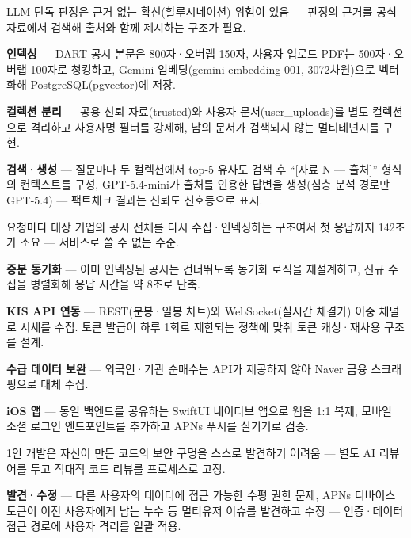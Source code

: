 \begin{substeps}
  \item LLM 단독 판정은 근거 없는 확신(할루시네이션) 위험이 있음 --- 판정의 근거를 공식 자료에서 검색해 출처와 함께 제시하는 구조가 필요.
  \item \textbf{인덱싱} --- DART 공시 본문은 800자·오버랩 150자, 사용자 업로드 PDF는 500자·오버랩 100자로 청킹하고, Gemini 임베딩(gemini-embedding-001, 3072차원)으로 벡터화해 PostgreSQL(pgvector)에 저장.
  \item \textbf{컬렉션 분리} --- 공용 신뢰 자료(trusted)와 사용자 문서(user\_uploads)를 별도 컬렉션으로 격리하고 사용자명 필터를 강제해, 남의 문서가 검색되지 않는 멀티테넌시를 구현.
  \item \textbf{검색·생성} --- 질문마다 두 컬렉션에서 top-5 유사도 검색 후 ``[자료 N --- 출처]'' 형식의 컨텍스트를 구성, GPT-5.4-mini가 출처를 인용한 답변을 생성(심층 분석 경로만 GPT-5.4) --- 팩트체크 결과는 신뢰도 신호등으로 표시.
\end{substeps}

\begin{substeps}
  \item 요청마다 대상 기업의 공시 전체를 다시 수집·인덱싱하는 구조여서 첫 응답까지 142초가 소요 --- 서비스로 쓸 수 없는 수준.
  \item \textbf{증분 동기화} --- 이미 인덱싱된 공시는 건너뛰도록 동기화 로직을 재설계하고, 신규 수집을 병렬화해 응답 시간을 약 8초로 단축.
\end{substeps}

\begin{substeps}
  \item \textbf{KIS API 연동} --- REST(분봉·일봉 차트)와 WebSocket(실시간 체결가) 이중 채널로 시세를 수집. 토큰 발급이 하루 1회로 제한되는 정책에 맞춰 토큰 캐싱·재사용 구조를 설계.
  \item \textbf{수급 데이터 보완} --- 외국인·기관 순매수는 API가 제공하지 않아 Naver 금융 스크래핑으로 대체 수집.
  \item \textbf{iOS 앱} --- 동일 백엔드를 공유하는 SwiftUI 네이티브 앱으로 웹을 1:1 복제, 모바일 소셜 로그인 엔드포인트를 추가하고 APNs 푸시를 실기기로 검증.
\end{substeps}

\begin{substeps}
  \item 1인 개발은 자신이 만든 코드의 보안 구멍을 스스로 발견하기 어려움 --- 별도 AI 리뷰어를 두고 적대적 코드 리뷰를 프로세스로 고정.
  \item \textbf{발견·수정} --- 다른 사용자의 데이터에 접근 가능한 수평 권한 문제, APNs 디바이스 토큰이 이전 사용자에게 남는 누수 등 멀티유저 이슈를 발견하고 수정 --- 인증·데이터 접근 경로에 사용자 격리를 일괄 적용.
\end{substeps}
